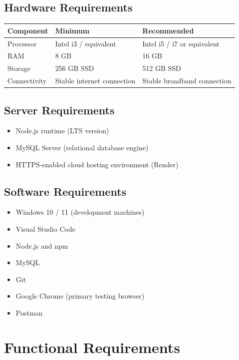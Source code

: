 \documentclass[11pt,a4paper]{report}
\begin{document}
\section{Hardware Requirements}
\begin{longtable}{@{}p{3.5cm}p{4.7cm}p{4.7cm}@{}}
\toprule
\rowcolor{pine!10}\textbf{Component} & \textbf{Minimum} & \textbf{Recommended} \\
\midrule
\endhead
Processor & Intel i3 / equivalent & Intel i5 / i7 or equivalent \\
RAM & 8 GB & 16 GB \\
Storage & 256 GB SSD & 512 GB SSD \\
Connectivity & Stable internet connection & Stable broadband connection \\
\bottomrule
\end{longtable}

\section{Server Requirements}
\begin{itemize}[leftmargin=1.3em]
  \item Node.js runtime (LTS version)
  \item MySQL Server (relational database engine)
  \item HTTPS-enabled cloud hosting environment (Render)
\end{itemize}

\section{Software Requirements}
\begin{itemize}[leftmargin=1.3em]
  \item Windows 10 / 11 (development machines)
  \item Visual Studio Code
  \item Node.js and npm
  \item MySQL
  \item Git
  \item Google Chrome (primary testing browser)
  \item Postman
\end{itemize}

\chapter{Functional Requirements}
\end{document}
